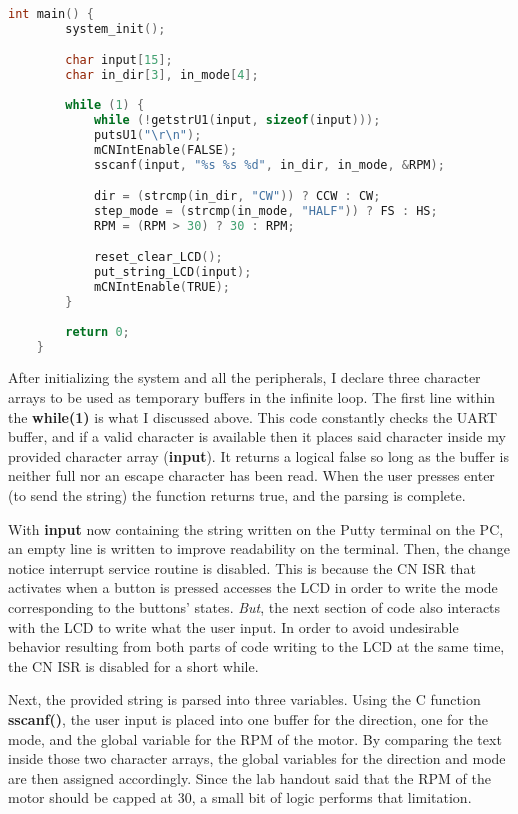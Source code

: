 \documentclass[a4paper, 12pt]{article}
\begin{document}
	\begin{mdframed}[backgroundcolor=code-gray, roundcorner=10pt,
								innerleftmargin=5, innertopmargin=5, innerbottommargin=5]	
	\begin{lstlisting}[language=C, caption=Main Program Loop, tabsize=2]
	int main() {
		system_init();

		char input[15];
		char in_dir[3], in_mode[4];
	
		while (1) {
			while (!getstrU1(input, sizeof(input)));
			putsU1("\r\n");
			mCNIntEnable(FALSE);
			sscanf(input, "%s %s %d", in_dir, in_mode, &RPM);

			dir = (strcmp(in_dir, "CW")) ? CCW : CW;
			step_mode = (strcmp(in_mode, "HALF")) ? FS : HS;
			RPM = (RPM > 30) ? 30 : RPM;

			reset_clear_LCD();
			put_string_LCD(input);
			mCNIntEnable(TRUE);
		}
	
		return 0;
	}
	\end{lstlisting}
	\end{mdframed}
	
After initializing the system and all the peripherals, I declare three character arrays to be used as temporary buffers in the infinite loop. The first line within the \textbf{while(1)} is what I discussed above. This code constantly checks the UART buffer, and if a valid character is available then it places said character inside my provided character array (\textbf{input}). It returns a logical false so long as the buffer is neither full nor an escape character has been read. When the user presses enter (to send the string) the function returns true, and the parsing is complete.

With \textbf{input} now containing the string written on the Putty terminal on the PC, an empty line is written to improve readability on the terminal. Then, the change notice interrupt service routine is disabled. This is because the CN ISR that activates when a button is pressed accesses the LCD in order to write the mode corresponding to the buttons' states. \textit{But}, the next section of code also interacts with the LCD to write what the user input. In order to avoid undesirable behavior resulting from both parts of code writing to the LCD at the same time, the CN ISR is disabled for a short while.

Next, the provided string is parsed into three variables. Using the C function \textbf{sscanf()}, the user input is placed into one buffer for the direction, one for the mode, and the global variable for the RPM of the motor. By comparing the text inside those two character arrays, the global variables for the direction and mode are then assigned accordingly. Since the lab handout said that the RPM of the motor should be capped at 30, a small bit of logic performs that limitation.
\end{document}
